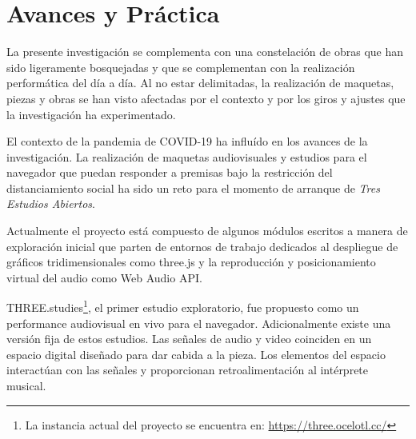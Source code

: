 \section*{Avances y Práctica}

La presente investigación se complementa con una constelación de obras que han sido ligeramente bosquejadas y que se complementan con la realización performática del día a día. Al no estar delimitadas, la realización de maquetas, piezas y obras se han visto afectadas por el contexto y por los giros y ajustes que la investigación ha experimentado. 

El contexto de la pandemia de COVID-19 ha influído en los avances de la investigación. La realización de maquetas audiovisuales y estudios para el navegador que puedan responder a premisas bajo la restricción del distanciamiento social ha sido un reto para el momento de arranque de \textit{Tres Estudios Abiertos}. 

Actualmente el proyecto está compuesto de algunos módulos escritos a manera de exploración inicial que parten de entornos de trabajo dedicados al despliegue de gráficos tridimensionales como three.js y la reproducción y posicionamiento virtual del audio como Web Audio API. 




THREE.studies\footnote{La instancia actual del proyecto se encuentra en: \url{https://three.ocelotl.cc/}}, el primer estudio exploratorio, fue propuesto como un performance audiovisual en vivo para el navegador. Adicionalmente existe una versión fija de estos estudios. Las señales de audio y video coinciden en un espacio digital diseñado para dar cabida a la pieza. Los elementos del espacio interactúan con las señales y proporcionan retroalimentación al intérprete musical.

